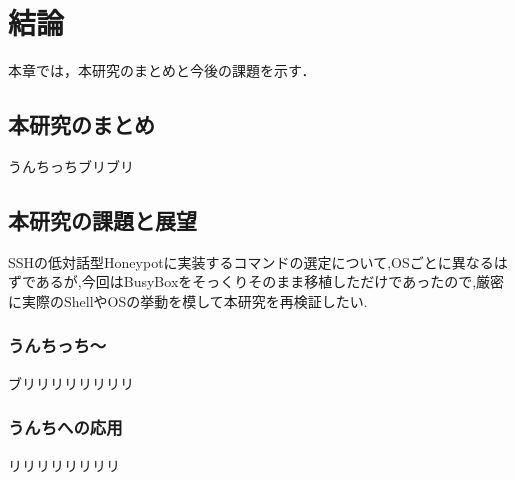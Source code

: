 \chapter{結論}
\label{conclusion}

本章では，本研究のまとめと今後の課題を示す．

\section{本研究のまとめ}

うんちっちブリブリ

\section{本研究の課題と展望}
SSHの低対話型Honeypotに実装するコマンドの選定について,OSごとに異なるはずであるが,今回はBusyBoxをそっくりそのまま移植しただけであったので,厳密に実際のShellやOSの挙動を模して本研究を再検証したい.

\subsection{うんちっち〜}

ブリリリリリリリリ

\subsection{うんちへの応用}

リリリリリリリリ

